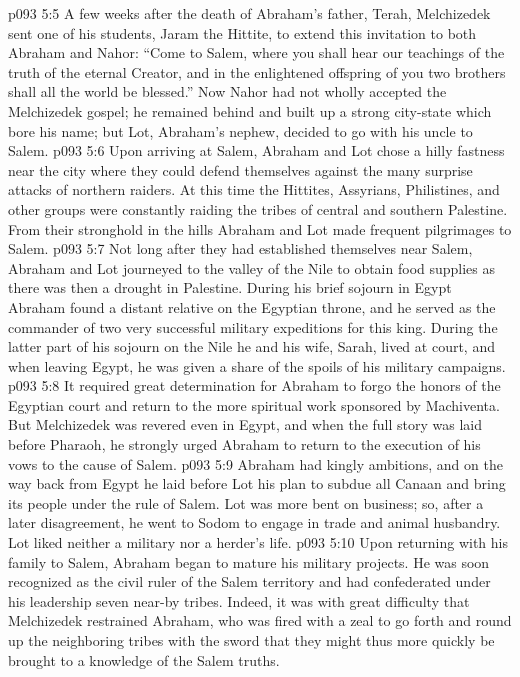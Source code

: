 \vs p093 5:5 A few weeks after the death of Abraham’s father, Terah, Melchizedek sent one of his students, Jaram the Hittite, to extend this invitation to both Abraham and Nahor: “Come to Salem, where you shall hear our teachings of the truth of the eternal Creator, and in the enlightened offspring of you two brothers shall all the world be blessed.” Now Nahor had not wholly accepted the Melchizedek gospel; he remained behind and built up a strong city\hyp{}state which bore his name; but Lot, Abraham’s nephew, decided to go with his uncle to Salem.
\vs p093 5:6 Upon arriving at Salem, Abraham and Lot chose a hilly fastness near the city where they could defend themselves against the many surprise attacks of northern raiders. At this time the Hittites, Assyrians, Philistines, and other groups were constantly raiding the tribes of central and southern Palestine. From their stronghold in the hills Abraham and Lot made frequent pilgrimages to Salem.
\pc \vs p093 5:7 Not long after they had established themselves near Salem, Abraham and Lot journeyed to the valley of the Nile to obtain food supplies as there was then a drought in Palestine. During his brief sojourn in Egypt Abraham found a distant relative on the Egyptian throne, and he served as the commander of two very successful military expeditions for this king. During the latter part of his sojourn on the Nile he and his wife, Sarah, lived at court, and when leaving Egypt, he was given a share of the spoils of his military campaigns.
\vs p093 5:8 It required great determination for Abraham to forgo the honors of the Egyptian court and return to the more spiritual work sponsored by Machiventa. But Melchizedek was revered even in Egypt, and when the full story was laid before Pharaoh, he strongly urged Abraham to return to the execution of his vows to the cause of Salem.
\pc \vs p093 5:9 Abraham had kingly ambitions, and on the way back from Egypt he laid before Lot his plan to subdue all Canaan and bring its people under the rule of Salem. Lot was more bent on business; so, after a later disagreement, he went to Sodom to engage in trade and animal husbandry. Lot liked neither a military nor a herder’s life.
\vs p093 5:10 Upon returning with his family to Salem, Abraham began to mature his military projects. He was soon recognized as the civil ruler of the Salem territory and had confederated under his leadership seven near\hyp{}by tribes. Indeed, it was with great difficulty that Melchizedek restrained Abraham, who was fired with a zeal to go forth and round up the neighboring tribes with the sword that they might thus more quickly be brought to a knowledge of the Salem truths.
